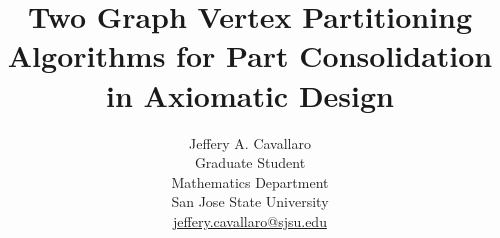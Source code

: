 \documentclass[letterpaper,12pt,fleqn]{article}
\begin{document}
\title{Two Graph Vertex Partitioning Algorithms for Part Consolidation in Axiomatic Design}
\author{Jeffery A. Cavallaro\\
  Graduate Student\\
  Mathematics Department\\
  San Jose State University\\
  \url{jeffery.cavallaro@sjsu.edu}}

\maketitle






\end{document}
